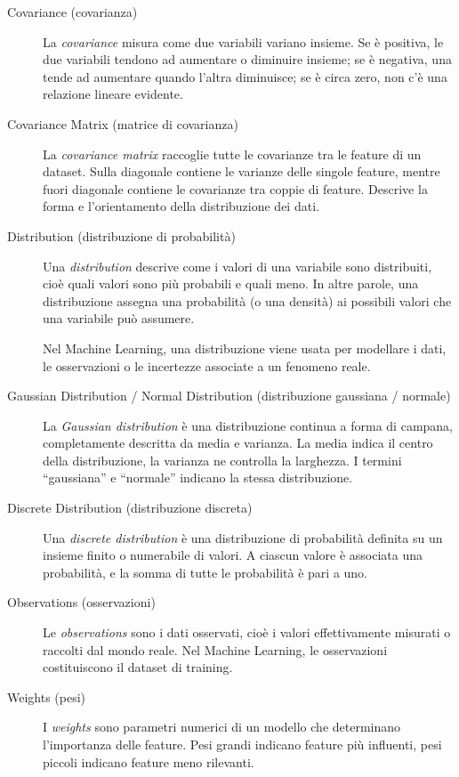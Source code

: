 \documentclass[a4paper,12pt]{report}
\begin{document}
\begin{description}
    \item[Covariance (covarianza)]
La \emph{covariance} misura come due variabili variano insieme.
Se è positiva, le due variabili tendono ad aumentare o diminuire insieme;
se è negativa, una tende ad aumentare quando l’altra diminuisce;
se è circa zero, non c’è una relazione lineare evidente.

    \item[Covariance Matrix (matrice di covarianza)]
La \emph{covariance matrix} raccoglie tutte le covarianze tra le feature di un
dataset.
Sulla diagonale contiene le varianze delle singole feature, mentre fuori diagonale
contiene le covarianze tra coppie di feature.
Descrive la forma e l’orientamento della distribuzione dei dati.

    \item[Distribution (distribuzione di probabilità)]
Una \emph{distribution} descrive come i valori di una variabile sono
distribuiti, cioè quali valori sono più probabili e quali meno.
In altre parole, una distribuzione assegna una probabilità (o una densità)
ai possibili valori che una variabile può assumere.

Nel Machine Learning, una distribuzione viene usata per modellare i dati,
le osservazioni o le incertezze associate a un fenomeno reale.

    \item[Gaussian Distribution / Normal Distribution (distribuzione gaussiana / normale)]
La \emph{Gaussian distribution} è una distribuzione continua a forma di campana,
completamente descritta da media e varianza.
La media indica il centro della distribuzione, la varianza ne controlla la larghezza.
I termini “gaussiana” e “normale” indicano la stessa distribuzione.

    \item[Discrete Distribution (distribuzione discreta)]
Una \emph{discrete distribution} è una distribuzione di probabilità definita su un
insieme finito o numerabile di valori.
A ciascun valore è associata una probabilità, e la somma di tutte le probabilità
è pari a uno.

    \item[Observations (osservazioni)]
Le \emph{observations} sono i dati osservati, cioè i valori effettivamente misurati
o raccolti dal mondo reale.
Nel Machine Learning, le osservazioni costituiscono il dataset di training.

    \item[Weights (pesi)]
I \emph{weights} sono parametri numerici di un modello che determinano l’importanza
delle feature.
Pesi grandi indicano feature più influenti, pesi piccoli indicano feature meno
rilevanti.


\end{description}
\end{document}
